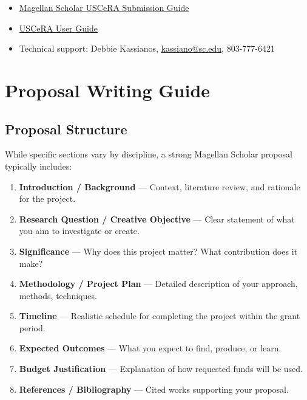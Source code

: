\documentclass[11pt, letterpaper]{article}
\newcommand{\tipbox}[2]{%
\begin{tcolorbox}[colback=Black10, colframe=Garnet, title={\textbf{#1}}]
#2
\end{tcolorbox}
}
\begin{document}
\tipbox{USCeRA Resources}{
\begin{itemize}[nosep]
    \item \href{https://sc.edu/about/offices_and_divisions/undergraduate_research/documents/mgs_uscera-guide.pdf}{Magellan Scholar USCeRA Submission Guide}
    \item \href{https://sam.research.sc.edu/pdf/USCERA_Userguide.pdf}{USCeRA User Guide}
    \item Technical support: Debbie Kassianos, \href{mailto:kassiano@sc.edu}{kassiano@sc.edu}, 803-777-6421
\end{itemize}
}

\section{Proposal Writing Guide}

\subsection{Proposal Structure}

While specific sections vary by discipline, a strong Magellan Scholar proposal typically includes:

\begin{enumerate}[nosep]
    \item \textbf{Introduction / Background} --- Context, literature review, and rationale for the project.
    \item \textbf{Research Question / Creative Objective} --- Clear statement of what you aim to investigate or create.
    \item \textbf{Significance} --- Why does this project matter? What contribution does it make?
    \item \textbf{Methodology / Project Plan} --- Detailed description of your approach, methods, techniques.
    \item \textbf{Timeline} --- Realistic schedule for completing the project within the grant period.
    \item \textbf{Expected Outcomes} --- What you expect to find, produce, or learn.
    \item \textbf{Budget Justification} --- Explanation of how requested funds will be used.
    \item \textbf{References / Bibliography} --- Cited works supporting your proposal.
\end{enumerate}
\end{document}
